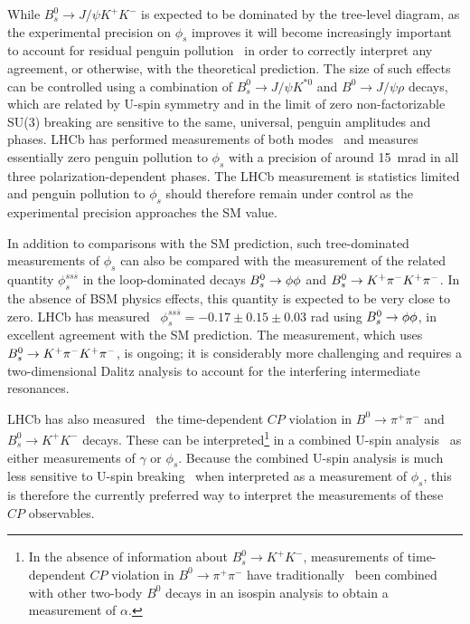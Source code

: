 While $B^0_s \to J/\psi K^+ K^-$ is expected to be dominated by the tree-level diagram,
as the experimental precision on $\phi_s$ improves it will become increasingly important
to account for residual penguin pollution~\cite{PENGUINPOLTHEORY} in order to correctly interpret any agreement,
or otherwise, with the theoretical prediction. The size of such effects can be controlled
using a combination of $B^0_s \to J/\psi K^{*0}$ and $B^0 \to J/\psi \rho$ decays,
which are related by U-spin symmetry and in the limit of zero non-factorizable SU(3)
breaking are sensitive to the same, universal, penguin amplitudes and phases.
LHCb has performed measurements of both modes~\cite{LHCb-PAPER-2015-034,LHCb-PAPER-2014-058} and
measures essentially zero penguin pollution to $\phi_s$ with a precision of around 15~mrad
in all three polarization-dependent phases. The LHCb measurement is statistics limited
and penguin pollution to $\phi_s$ should therefore
remain under control as the experimental precision approaches the SM value.

In addition to comparisons with the SM prediction, such tree-dominated measurements of $\phi_s$ can also be compared with the measurement
of the related quantity $\phi_s^{ss\overline{s}}$ in the loop-dominated decays ${{B}^0_{s}} \rightarrow \phi\phi$ and ${{B}^0_{s}}\rightarrow {\ensuremath{{K}^+}}\pi^-{{K}^+}\pi^-$.
In the absence of BSM physics effects, this quantity is expected to be very close to zero.
LHCb has measured~\cite{LHCb-PAPER-2014-026} $\phi_s^{ss\overline{s}} = -0.17 \pm 0.15 \pm 0.03$ rad using
${{B}^0_{s}}\rightarrow \phi\phi$, in excellent agreement with the SM prediction. The measurement,
which uses ${{B}^0_{s}}\rightarrow {\ensuremath{{K}^+}}\pi^-{{K}^+}\pi^-$, is ongoing; it is considerably more challenging and
requires a two-dimensional Dalitz analysis to account
for the interfering intermediate resonances. 

LHCb has also measured~\cite{LHCb:2017ood} the time-dependent $CP$ violation in $B^0 \to \pi^+ \pi^-$ and $B^0_s \to K^+ K^-$ decays.
These can be interpreted\footnote{In the absence of information about $B^0_s \to K^+ K^-$, measurements of time-dependent $CP$ violation in
$B^0 \to \pi^+ \pi^-$ have traditionally~\cite{HFAG} been combined with other two-body $B^0$ decays in an isospin analysis to obtain a measurement of $\alpha$.}
in a combined U-spin analysis~\cite{Fleischer:1999pa} as either measurements of $\gamma$ or $\phi_s$.
Because the combined U-spin analysis is much less sensitive
to U-spin breaking~\cite{LHCb-PAPER-2014-045} when interpreted as a measurement of $\phi_s$, this is therefore the currently preferred way
to interpret the measurements of these $CP$ observables.


